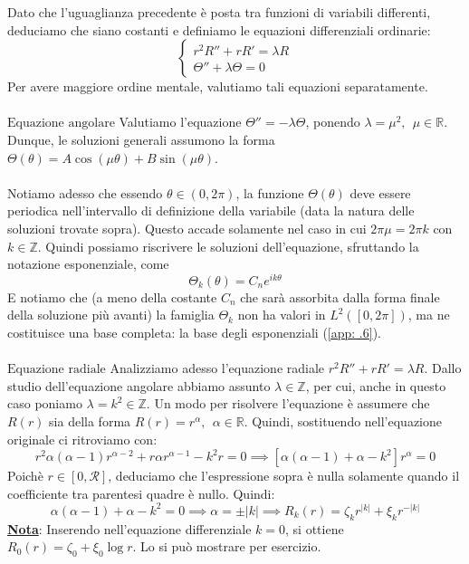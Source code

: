 \documentclass[a4paper,12pt]{report}
\begin{document}
\newpage

Dato che l'uguaglianza precedente è posta tra funzioni di variabili differenti, deduciamo che siano costanti e definiamo le equazioni differenziali ordinarie:
\[\begin{cases}
    r^2R''+rR'=\lambda R
    \\\Theta''+\lambda\Theta=0
\end{cases}\]
Per avere maggiore ordine mentale, valutiamo tali equazioni separatamente.
\\
\\$\boxed{\text{Equazione angolare}}$  Valutiamo l'equazione $\Theta''=-\lambda\Theta$, ponendo $\lambda=\mu^2, \ \ \mu\in \mathbb{R}$. 
Dunque, le soluzioni generali assumono la forma $\Theta(\theta)=A\cos(\mu\theta)+B\sin(\mu\theta)$.
\\
\\Notiamo adesso che essendo $\theta\in (0,2\pi)$, la funzione $\Theta(\theta)$ deve essere periodica nell'intervallo di definizione della variabile (data la natura delle soluzioni trovate sopra). Questo accade solamente nel caso in cui $2\pi\mu=2\pi k$ con $k\in \mathbb{Z}$. Quindi possiamo riscrivere le soluzioni dell'equazione, sfruttando la notazione esponenziale, come 
\[\Theta_k(\theta)=C_ne^{ik\theta}\]
E notiamo che (a meno della costante $C_n$ che sarà assorbita dalla forma finale della soluzione più avanti) la famiglia $\Theta_k$ non ha valori in $L^2([0,2\pi])$, ma ne costituisce una base completa: la base degli esponenziali (\ref{app: .6}).
\\
\\$\boxed{\text{Equazione radiale}}$  Analizziamo adesso l'equazione radiale $r^2R''+rR'=\lambda R$. Dallo studio dell'equazione angolare abbiamo assunto $\lambda\in \mathbb{Z}$, per cui, anche in questo caso poniamo $\lambda=k^2\in \mathbb{Z}$. Un modo per risolvere l'equazione è assumere che $R(r)$ sia della forma $R(r)=r^\alpha,\ \ \alpha \in \mathbb{R}$. Quindi, sostituendo nell'equazione originale ci ritroviamo con:
\[r^2\alpha(\alpha-1)r^{\alpha-2}+r\alpha r^{\alpha-1}-k^2r=0\implies [\alpha(\alpha-1)+\alpha-k^2]r^\alpha=0\]
Poichè $r\in[0, \mathcal{R}]$, deduciamo che l'espressione sopra è nulla solamente quando il coefficiente tra parentesi quadre è nullo. Quindi:
\[\alpha(\alpha-1)+\alpha-k^2=0\implies\alpha=\pm|k|\implies R_k(r)=\zeta_kr^{|k|}+\xi_kr^{-|k|}\]
\underline{\textbf{Nota}}: Inserendo nell'equazione differenziale $k=0$, si ottiene $R_0(r)=\zeta_0+\xi_0\log r$. Lo si può mostrare per esercizio.
\end{document}
